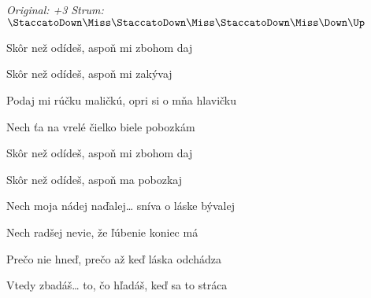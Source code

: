 \begin{song}


\begin{headerbox}
\textit{Original: +3} \quad
\textit{Strum:} $\StaccatoDown\Miss\StaccatoDown\Miss\StaccatoDown\Miss\Down\Up$
\end{headerbox}

\begin{hchordbox}
\end{hchordbox}

\Large




\bigskip

Skôr než odídeš,  aspoň mi zbohom daj  \par
Skôr než odídeš, aspoň mi zakývaj \par
Podaj mi rúčku maličkú, opri si o mňa hlavičku \par
Nech ťa na vrelé čielko biele pobozkám \par

\bigskip

Skôr než odídeš,  aspoň mi zbohom daj  \par
Skôr než odídeš, aspoň ma pobozkaj \par
Nech moja nádej naďalej… sníva o láske bývalej \par
Nech radšej nevie, že ľúbenie koniec má \par

\bigskip

Prečo nie hneď, prečo až keď láska odchádza \par
{}Vtedy zbadáš… to, čo hľadáš, keď sa to stráca \par


\end{song}
